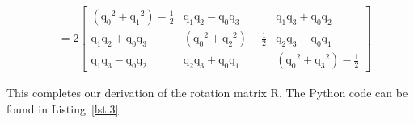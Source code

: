 \begin{align*}
		&=2
		\begin{bmatrix}
    	({\mathrm{q}_0}^2+{\mathrm{q}_1}^2)-\frac{1}{2} & \mathrm{q}_1\mathrm{q}_2-\mathrm{q}_0\mathrm{q}_3 & \mathrm{q}_1\mathrm{q}_3+\mathrm{q}_0\mathrm{q}_2 \\
    	\mathrm{q}_1\mathrm{q}_2+\mathrm{q}_0\mathrm{q}_3 & ({\mathrm{q}_0}^2+{\mathrm{q}_2}^2)-\frac{1}{2} & \mathrm{q}_2\mathrm{q}_3-\mathrm{q}_0\mathrm{q}_1 \\
    	\mathrm{q}_1\mathrm{q}_3-\mathrm{q}_0\mathrm{q}_2 & \mathrm{q}_2\mathrm{q}_3+\mathrm{q}_0\mathrm{q}_1 & ({\mathrm{q}_0}^2+{\mathrm{q}_3}^2)-\frac{1}{2}
		\end{bmatrix}
\end{align*} 

\bigskip

\noindent This completes our derivation of the rotation matrix $\bm{\mathrm{R}}$. The Python code can be found in Listing~\ref{lst:3}.

